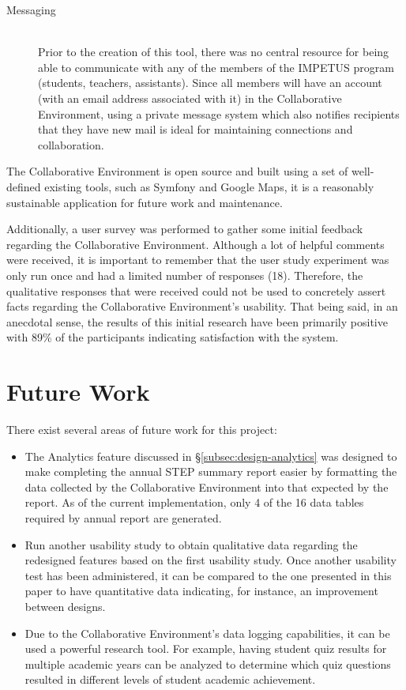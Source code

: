 \begin{description}
	\item [Messaging] \hfill \\ Prior to the creation of this tool, there was no central resource for being able to communicate with any of the members of the IMPETUS program (students, teachers, assistants). Since all members will have an account (with an email address associated with it) in the Collaborative Environment, using a private message system which also notifies recipients that they have new mail is ideal for maintaining connections and collaboration.
\end{description}

The Collaborative Environment is open source and built using a set of well-defined existing tools, such as Symfony and Google Maps, it is a reasonably sustainable application for future work and maintenance.

Additionally, a user survey was performed to gather some initial feedback regarding the Collaborative Environment. Although a lot of helpful comments were received, it is important to remember that the user study experiment was only run once and had a limited number of responses (18). Therefore, the qualitative responses that were received could not be used to concretely assert facts regarding the Collaborative Environment's usability. That being said, in an anecdotal sense, the results of this initial research have been primarily positive with 89\% of the participants indicating satisfaction with the system.

\section{Future Work}
There exist several areas of future work for this project:
\begin{itemize}
	\item The Analytics feature discussed in \S \ref{subsec:design-analytics} was designed to make completing the annual STEP summary report easier by formatting the data collected by the Collaborative Environment into that expected by the report. As of the current implementation, only 4 of the 16 data tables required by annual report are generated.
	\item Run another usability study to obtain qualitative data regarding the redesigned features based on the first usability study. Once another usability test has been administered, it can be compared to the one presented in this paper to have quantitative data indicating, for instance, an improvement between designs.
	\item Due to the Collaborative Environment's data logging capabilities, it can be used a powerful research tool. For example, having student quiz results for multiple academic years can be analyzed to determine which quiz questions resulted in different levels of student academic achievement.
\end{itemize}